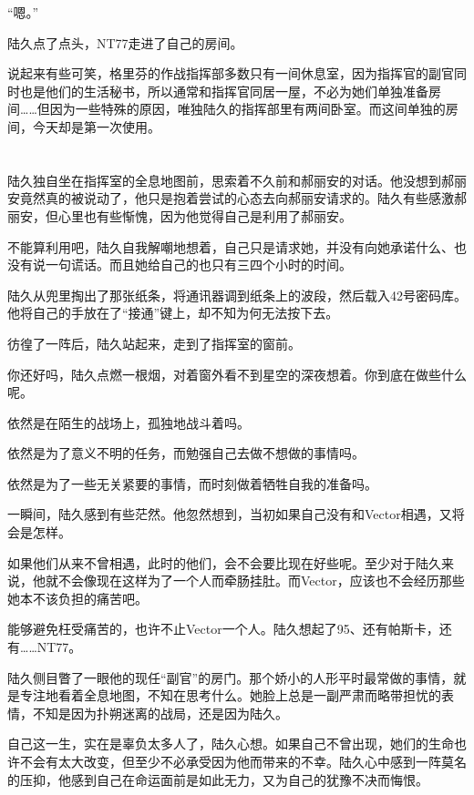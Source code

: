 “嗯。”

陆久点了点头，NT77走进了自己的房间。

说起来有些可笑，格里芬的作战指挥部多数只有一间休息室，因为指挥官的副官同时也是他们的生活秘书，所以通常和指挥官同居一屋，不必为她们单独准备房间……但因为一些特殊的原因，唯独陆久的指挥部里有两间卧室。而这间单独的房间，今天却是第一次使用。

\section*{}

陆久独自坐在指挥室的全息地图前，思索着不久前和郝丽安的对话。他没想到郝丽安竟然真的被说动了，他只是抱着尝试的心态去向郝丽安请求的。陆久有些感激郝丽安，但心里也有些惭愧，因为他觉得自己是利用了郝丽安。

不能算利用吧，陆久自我解嘲地想着，自己只是请求她，并没有向她承诺什么、也没有说一句谎话。而且她给自己的也只有三四个小时的时间。

陆久从兜里掏出了那张纸条，将通讯器调到纸条上的波段，然后载入42号密码库。他将自己的手放在了“接通”键上，却不知为何无法按下去。

彷徨了一阵后，陆久站起来，走到了指挥室的窗前。

你还好吗，陆久点燃一根烟，对着窗外看不到星空的深夜想着。你到底在做些什么呢。

依然是在陌生的战场上，孤独地战斗着吗。

依然是为了意义不明的任务，而勉强自己去做不想做的事情吗。

依然是为了一些无关紧要的事情，而时刻做着牺牲自我的准备吗。

一瞬间，陆久感到有些茫然。他忽然想到，当初如果自己没有和Vector相遇，又将会是怎样。

如果他们从来不曾相遇，此时的他们，会不会要比现在好些呢。至少对于陆久来说，他就不会像现在这样为了一个人而牵肠挂肚。而Vector，应该也不会经历那些她本不该负担的痛苦吧。

能够避免枉受痛苦的，也许不止Vector一个人。陆久想起了95、还有帕斯卡，还有……NT77。

陆久侧目瞥了一眼他的现任“副官”的房门。那个娇小的人形平时最常做的事情，就是专注地看着全息地图，不知在思考什么。她脸上总是一副严肃而略带担忧的表情，不知是因为扑朔迷离的战局，还是因为陆久。

自己这一生，实在是辜负太多人了，陆久心想。如果自己不曾出现，她们的生命也许不会有太大改变，但至少不必承受因为他而带来的不幸。陆久心中感到一阵莫名的压抑，他感到自己在命运面前是如此无力，又为自己的犹豫不决而悔恨。

